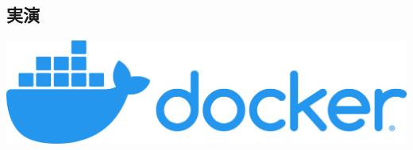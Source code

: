 \subsection{実演}
\begin{frame}{\ftitle}
    \includegraphics[keepaspectratio,width=\textwidth]{docker_logo.png}\\\vspace{1em}
    \hfill\cite{docker}
\end{frame}